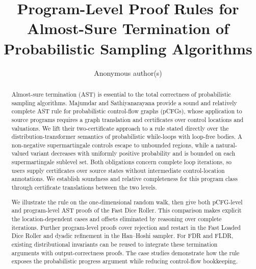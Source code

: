 \documentclass[runningheads]{llncs}
\newif\ifappendixversion
\begin{document}
\title{Program-Level Proof Rules for Almost-Sure Termination of Probabilistic Sampling Algorithms}

\author{Anonymous author(s)}
\institute{}

\maketitle

\begin{abstract}
Almost-sure termination (AST) is essential to the total correctness of probabilistic sampling algorithms. Majumdar and Sathiyanarayana provide a sound and relatively complete AST rule for probabilistic control-flow graphs (pCFGs), whose application to source programs requires a graph translation and certificates over control locations and valuations. We lift their two-certificate approach to a rule stated directly over the distribution-transformer semantics of probabilistic while-loops with loop-free bodies. A non-negative supermartingale controls escape to unbounded regions, while a natural-valued variant decreases with uniformly positive probability and is bounded on each supermartingale sublevel set. Both obligations concern complete loop iterations, so users supply certificates over source states without intermediate control-location annotations. We establish soundness and relative completeness for this program class through certificate translations between the two levels.

We illustrate the rule on the one-dimensional random walk, then give both pCFG-level and program-level AST proofs of the Fast Dice Roller. This comparison makes explicit the location-dependent cases and offsets eliminated by reasoning over complete iterations. Further program-level proofs cover rejection and restart in the Fast Loaded Dice Roller and dyadic refinement in the Han--Hoshi sampler. For FDR and FLDR, existing distributional invariants can be reused to integrate these termination arguments with output-correctness proofs. The case studies demonstrate how the rule exposes the probabilistic progress argument while reducing control-flow bookkeeping.

\end{abstract}












\ifappendixversion
\appendix




\fi



\end{document}
